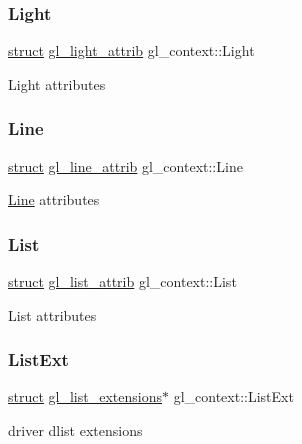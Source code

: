 \subsubsection{\texorpdfstring{Light}{Light}}
{\footnotesize\ttfamily \hyperlink{interfacestruct}{struct} \hyperlink{structgl__light__attrib}{gl\+\_\+light\+\_\+attrib} gl\+\_\+context\+::\+Light}

Light attributes \mbox{\label{structgl__context_a650b57ea969135a891cccfed705c9685}} 
\subsubsection{\texorpdfstring{Line}{Line}}
{\footnotesize\ttfamily \hyperlink{interfacestruct}{struct} \hyperlink{structgl__line__attrib}{gl\+\_\+line\+\_\+attrib} gl\+\_\+context\+::\+Line}

\hyperlink{struct_line}{Line} attributes \mbox{\label{structgl__context_a57a14cd1572a6d337817ad2934bf1fac}} 
\subsubsection{\texorpdfstring{List}{List}}
{\footnotesize\ttfamily \hyperlink{interfacestruct}{struct} \hyperlink{structgl__list__attrib}{gl\+\_\+list\+\_\+attrib} gl\+\_\+context\+::\+List}

List attributes \mbox{\label{structgl__context_aba2e4cfb56b1246b62a464dbd0987012}} 
\subsubsection{\texorpdfstring{List\+Ext}{ListExt}}
{\footnotesize\ttfamily \hyperlink{interfacestruct}{struct} \hyperlink{structgl__list__extensions}{gl\+\_\+list\+\_\+extensions}$\ast$ gl\+\_\+context\+::\+List\+Ext}

driver dlist extensions \mbox{\label{structgl__context_a2b873d30b560c7e6551cf1c171504ec0}} 
